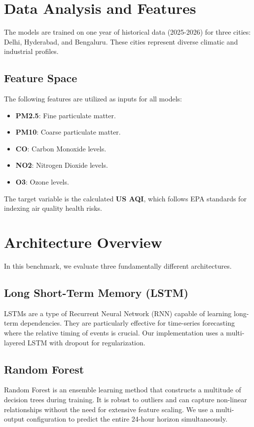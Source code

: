 \documentclass[11pt,a4paper,oneside]{book}
\begin{document}
\chapter{Data Analysis and Features}
The models are trained on one year of historical data (2025-2026) for three cities: Delhi, Hyderabad, and Bengaluru. These cities represent diverse climatic and industrial profiles.

\section{Feature Space}
The following features are utilized as inputs for all models:
\begin{itemize}
    \item \textbf{PM2.5}: Fine particulate matter.
    \item \textbf{PM10}: Coarse particulate matter.
    \item \textbf{CO}: Carbon Monoxide levels.
    \item \textbf{NO2}: Nitrogen Dioxide levels.
    \item \textbf{O3}: Ozone levels.
\end{itemize}

The target variable is the calculated \textbf{US AQI}, which follows EPA standards for indexing air quality health risks.

\chapter{Architecture Overview}
In this benchmark, we evaluate three fundamentally different architectures.

\section{Long Short-Term Memory (LSTM)}
LSTMs are a type of Recurrent Neural Network (RNN) capable of learning long-term dependencies. They are particularly effective for time-series forecasting where the relative timing of events is crucial. Our implementation uses a multi-layered LSTM with dropout for regularization.

\section{Random Forest}
Random Forest is an ensemble learning method that constructs a multitude of decision trees during training. It is robust to outliers and can capture non-linear relationships without the need for extensive feature scaling. We use a multi-output configuration to predict the entire 24-hour horizon simultaneously.
\end{document}
